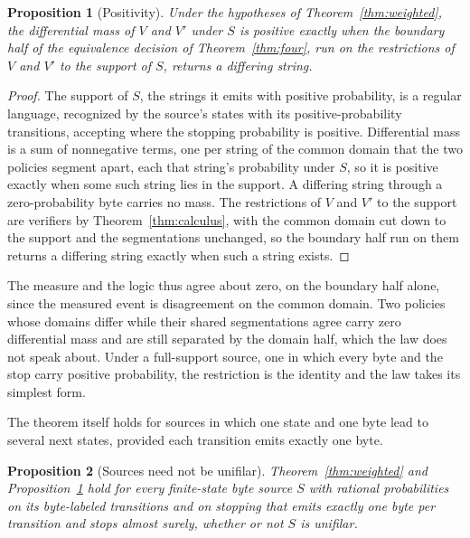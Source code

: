 \documentclass[11pt,a4paper]{article}
\theoremstyle{definition}
\theoremstyle{plain}
\newtheorem{proposition}{Proposition}
\begin{document}
\begin{proposition}[Positivity]\label{prop:positivity} Under the hypotheses of Theorem~\ref{thm:weighted}, the
differential mass of $V$ and $V'$ under $S$ is positive exactly when the boundary half of the equivalence decision of
Theorem~\ref{thm:four}, run on the restrictions of $V$ and $V'$ to the support of $S$, returns a differing string.
\end{proposition}

\begin{proof}
The support of $S$, the strings it emits with positive probability, is a regular language, recognized by the source's
states with its positive-probability transitions, accepting where the stopping probability is positive. Differential
mass is a sum of nonnegative terms, one per string of the common domain that the two policies segment apart, each that
string's probability under $S$, so it is positive exactly when some such string lies in the support. A differing string
through a zero-probability byte carries no mass. The restrictions of $V$ and $V'$ to the support are verifiers by
Theorem~\ref{thm:calculus}, with the common domain cut down to the support and the segmentations unchanged, so the
boundary half run on them returns a differing string exactly when such a string exists.
\end{proof}

The measure and the logic thus agree about zero, on the boundary half alone, since the measured event is disagreement on
the common domain. Two policies whose domains differ while their shared segmentations agree carry zero differential mass
and are still separated by the domain half, which the law does not speak about. Under a full-support source, one in
which every byte and the stop carry positive probability, the restriction is the identity and the law takes its simplest
form.

The theorem itself holds for sources in which one state and one byte lead to several next states, provided each
transition emits exactly one byte.

\begin{proposition}[Sources need not be unifilar]\label{prop:weighted-general} Theorem~\ref{thm:weighted} and
Proposition~\ref{prop:positivity} hold for every finite-state byte source $S$ with rational probabilities on its
byte-labeled transitions and on stopping that emits exactly one byte per transition and stops almost surely, whether or
not $S$ is unifilar.
\end{proposition}
\end{document}
